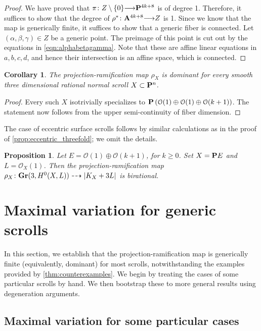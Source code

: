 \documentclass[11pt,reqno]{amsart}
\theoremstyle{plain}
\newtheorem{proposition}[theorem]{Proposition}
\newtheorem{corollary}[theorem]{Corollary}
\theoremstyle{definition}
\theoremstyle{remark}
\numberwithin{equation}{section}
\renewcommand{\to}{{\longrightarrow}}
\numberwithin{equation}{section}
\renewcommand{\O}{\mathcal O}
\begin{document}
\begin{proof}
             We have proved that $\pi \from Z \setminus \{0\} \to \P^{4k+8}$ is of degree 1.
             Therefore, it suffices to show that the degree of $\rho^* \from \A^{4k+8} \to Z$ is 1.
             Since we know that the map is generically finite, it suffices to show that a generic fiber is connected.
             Let $(\alpha,\beta,\gamma) \in Z$ be a generic point.
             The preimage of this point is cut out by the equations in \eqref{eqn:alphabetagamma}.
             Note that these are affine linear equations in $a, b, c, d$, and hence their intersection is an affine space, which is connected.
\end{proof}

\begin{corollary}\label{cor:maxvariation3scrolls}
  The projection-ramification map $\rho_{X}$ is dominant for every smooth three dimensional rational normal scroll $X \subset \P^{n}$.
\end{corollary}
\begin{proof}
  Every such $X$ isotrivially specializes to $\P \left(\O(1) \oplus \O(1) \oplus \O(k+1)\right)$.
  The statement now follows from the upper semi-continuity of fiber dimension.
\end{proof}

The case of eccentric surface scrolls follows by similar calculations as in the proof of \autoref{prop:eccentric_threefold}; we omit the details.
\begin{proposition}\label{prop:eccentric_surface}
  Let $E = \O(1) \oplus \O(k+1)$, for $k \geq 0$.
  Set $X = \P E$ and $L = \O_X(1)$.
  Then the projection-ramification map $\rho_X \from \Gr(3, H^0(X, L)) \dashrightarrow |K_X + 3L|$ is birational.
\end{proposition}

\section{Maximal variation for generic scrolls}\label{sec:generic}
In this section, we establish that the projection-ramification map is generically finite (equivalently, dominant) for most scrolls, notwithstanding the examples provided by \autoref{thm:counterexamples}.
We begin by treating the cases of some particular scrolls by hand.
We then bootstrap these to more general results using degeneration arguments.

\subsection{Maximal variation for some particular cases}\label{sec:lowdegree}
\end{document}
